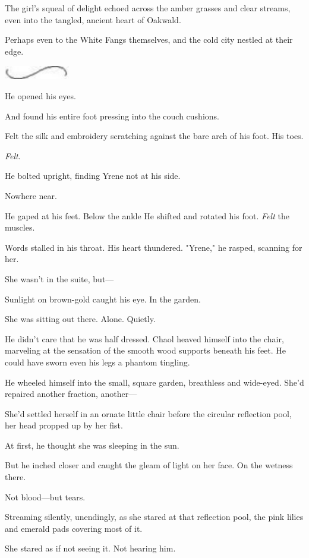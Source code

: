 The girl's squeal of delight echoed across the amber grasses and clear streams, even into the tangled, ancient heart of Oakwald.

Perhaps even to the White Fangs themselves, and the cold city nestled at their edge.

\includegraphics[width=1.12in,height=0.24in]{images/seperator}

He opened his eyes.

And found his entire foot pressing into the couch cushions.

Felt the silk and embroidery scratching against the bare arch of his foot. His toes.

\emph{Felt}.

He bolted upright, finding Yrene not at his side.

Nowhere near.

He gaped at his feet. Below the ankle  He shifted and rotated his foot. \emph{Felt} the muscles.

Words stalled in his throat. His heart thundered. "Yrene," he rasped, scanning for her.

She wasn't in the suite, but---

Sunlight on brown-gold caught his eye. In the garden.

She was sitting out there. Alone. Quietly.

He didn't care that he was half dressed. Chaol heaved himself into the chair, marveling at the sensation of the smooth wood supports beneath his feet. He could have sworn even his legs  a phantom tingling.

He wheeled himself into the small, square garden, breathless and wide-eyed. She'd repaired another fraction, another---

She'd settled herself in an ornate little chair before the circular reflection pool, her head propped up by her fist.

At first, he thought she was sleeping in the sun.

But he inched closer and caught the gleam of light on her face. On the wetness there.

Not blood---but tears.

Streaming silently, unendingly, as she stared at that reflection pool, the pink lilies and emerald pads covering most of it.

She stared as if not seeing it. Not hearing him.

